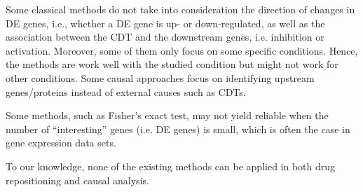 \documentclass[Minh_PhD_thesis.tex]{subfiles}
\begin{document}
Some classical methods do not take into consideration the direction of changes in DE genes, i.e., whether a DE gene is up- or down-regulated, as well as the association between the CDT and the downstream genes, i.e. inhibition or activation.  
Moreover, some of them only focus on some specific conditions. Hence, the methods are work well with the studied condition but might not work for other conditions.
Some causal approaches focus  on identifying upstream genes/proteins instead of external causes such as CDTs. 

Some methods, such as Fisher's exact test, may not yield reliable when the number of ``interesting'' genes (i.e. DE genes) is small, which is often the case in gene expression data sets. 

To our knowledge, none of the existing methods can be applied in both drug repositioning and causal analysis. 




%




\end{document}
